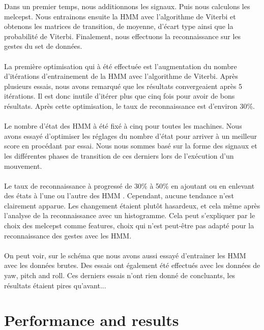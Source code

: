 Dans un premier temps, nous additionnons les signaux. Puis nous calculons les melcepst. Nous entrainons ensuite la HMM avec l'algorithme de Viterbi et obtenons les matrices de transition, de moyenne, d'écart type ainsi que la probabilité de Viterbi. Finalement, nous effectuons la reconnaissance sur les gestes du set de données.
\\
\\
La première optimisation qui à été effectuée est l'augmentation du nombre d'itérations d'entrainement de la HMM avec l'algorithme de Viterbi. Après plusieurs essais, nous avons remarqué que les résultats convergeaient après 5 itérations. Il est donc inutile d'itérer plus que cinq fois pour avoir de bons résultats.
Après cette optimisation, le taux de reconnaissance est d'environ 30\%.
\\
\\
Le nombre d'état des HMM à été fixé à cinq pour toutes les machines. Nous avons essayé d'optimiser les réglages du nombre d'état pour arriver à un meilleur score en procédant par essai. Nous nous sommes basé sur la forme des signaux et les différentes phases de transition de ces derniers lors de l'exécution d'un mouvement.
\\
\\
Le taux de reconnaissance à progressé de 30\% à 50\% en ajoutant ou en enlevant des états à l'une ou l'autre des HMM . Cependant, aucune tendance n'est clairement apparue. Les changement étaient plutôt hasardeux, et cela même après l'analyse de la reconnaissance avec un histogramme. Cela peut s'expliquer par le choix des melcepst comme features, choix qui n'est peut-être pas adapté pour la reconnaissance des gestes avec les HMM.
\\
\\
On peut voir, sur le schéma que nous avons aussi essayé d'entrainer les HMM avec les données brutes.
Des essais ont également été effectués avec les données de yaw, pitch and roll.
Ces derniers essais n'ont rien donné de concluants, les résultats étaient pires qu'avant...


\section{Performance and results}


